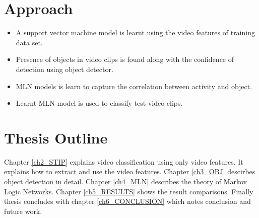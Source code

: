 \section{Approach}
\begin{itemize}
	\item A support vector machine model is learnt using the video features of training data set. 
	\item Presence of objects in video clips is found along with the confidence of detection using object detector. 
	\item MLN models is learn to capture the correlation between activity and object.
	\item Learnt MLN model is used to classify test video clips.

\end{itemize}

\section{Thesis Outline}
Chapter \ref{ch2_STIP} explains video classification using only video features. It explains how to extract and use the video features. 
Chapter \ref{ch3_OBJ} descirbes object detection in detail. 
Chapter \ref{ch4_MLN} describes the theory of Markov Logic Networks. 
Chapter \ref{ch5_RESULTS} shows the result comparisons.
Finally thesis concludes with chapter \ref{ch6_CONCLUSION} which notes conclusion and future work.

\begin{comment}
\begin{table}
\centering
\begin{tabular}{| c | c |}
\hline
{\bf item 1} & {\bf item 2} \\ \hline
%
abcde & 5 \\ \hline
%
pqrst & 4 \\ \hline
\end{tabular}
\caption{A sample table}
\label{table:1}
\end{table}
\end{comment}


